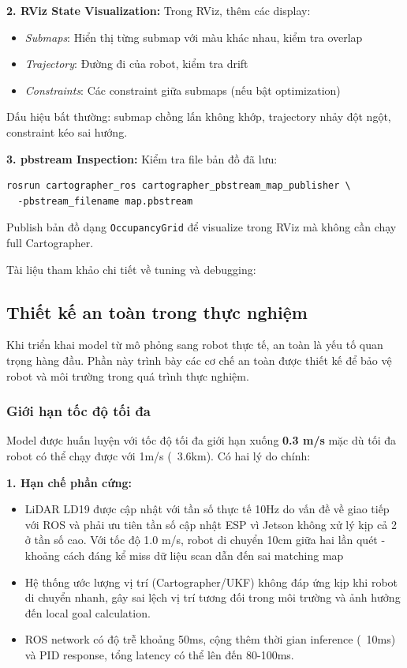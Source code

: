 \textbf{2. RViz State Visualization:} Trong RViz, thêm các display:
\begin{itemize}[nosep]
\item \textit{Submaps}: Hiển thị từng submap với màu khác nhau, kiểm tra overlap
\item \textit{Trajectory}: Đường đi của robot, kiểm tra drift
\item \textit{Constraints}: Các constraint giữa submaps (nếu bật optimization)
\end{itemize}
Dấu hiệu bất thường: submap chồng lấn không khớp, trajectory nhảy đột ngột, constraint kéo sai hướng.

\textbf{3. pbstream Inspection:} Kiểm tra file bản đồ đã lưu:
\begin{verbatim}
rosrun cartographer_ros cartographer_pbstream_map_publisher \
  -pbstream_filename map.pbstream
\end{verbatim}
Publish bản đồ dạng \texttt{OccupancyGrid} để visualize trong RViz mà không cần chạy full Cartographer.

Tài liệu tham khảo chi tiết về tuning và debugging: \cite{cartographer_tuning}

\subsection{Thiết kế an toàn trong thực nghiệm}
\label{sec:safety_design}

Khi triển khai model từ mô phỏng sang robot thực tế, an toàn là yếu tố quan trọng hàng đầu. Phần này trình bày các cơ chế an toàn được thiết kế để bảo vệ robot và môi trường trong quá trình thực nghiệm.

\subsubsection{Giới hạn tốc độ tối đa}

Model được huấn luyện với tốc độ tối đa giới hạn xuống \textbf{0.3 m/s} mặc dù tối đa robot có thể chạy được với 1m/s (~3.6km). Có hai lý do chính:

\textbf{1. Hạn chế phần cứng:}
\begin{itemize}[nosep]
\item LiDAR LD19 được cập nhật với tần số thực tế 10Hz do vấn đề về giao tiếp với ROS và phải ưu tiên tần số cập nhật ESP vì Jetson không xử lý kịp cả 2 ở tần số cao. Với tốc độ 1.0 m/s, robot di chuyển 10cm giữa hai lần quét - khoảng cách đáng kể miss dữ liệu scan dẫn đến sai matching map
\item Hệ thống ước lượng vị trí (Cartographer/UKF) không đáp ứng kịp khi robot di chuyển nhanh, gây sai lệch vị trí tương đối trong môi trường và ảnh hưởng đến local goal calculation.
\item ROS network có độ trễ khoảng 50ms, cộng thêm thời gian inference (~10ms) và PID response, tổng latency có thể lên đến 80-100ms.
\end{itemize}

